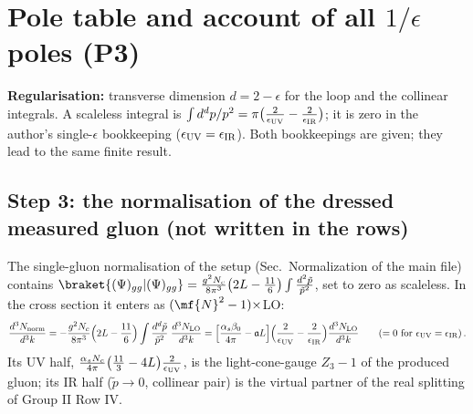 {\color{red}
\section{Pole table and account of all $1/\epsilon$ poles (P3)}\label{sec:dv-table}
 \textbf{Regularisation:} transverse dimension $d=2-\epsilon$ for the loop and the collinear integrals. A scaleless integral is $\int d^{d}p/p^{2}=\pi\big(\frac{2}{\epsilon_{\rm UV}}-\frac{2}{\epsilon_{\rm IR}}\big)$; it is zero in the author's single-$\epsilon$ bookkeeping ($\epsilon_{\rm UV}=\epsilon_{\rm IR}$). Both bookkeepings are given; they lead to the same finite result.

\subsection*{Step 3: the normalisation of the dressed measured gluon (not written in the rows)}
\noindent The single-gluon normalisation of the setup (Sec.~Normalization of the main file) contains $\braket{(\Psi)_{gg}|(\Psi)_{gg}}=\frac{g^{2}N_{c}}{8\pi^{3}}\big(2L-\frac{11}{6}\big)\int\frac{d^{2}\tilde p}{\tilde p^{2}}$, set to zero as scaleless. In the cross section it enters as $(\mf{N}^{2}-1)\times$LO:
\begin{align}
\frac{d^{3}N_{\rm norm}}{d^{3}k}=-\frac{g^{2}N_{c}}{8\pi^{3}}\Big(2L-\frac{11}{6}\Big)\int\frac{d^{d}\tilde p}{\tilde p^{2}}\;\frac{d^{3}N_{\rm LO}}{d^{3}k}=\Big[\frac{\alpha_{s}\beta_{0}}{4\pi}-\mathfrak{a}L\Big]\Big(\frac{2}{\epsilon_{\rm UV}}-\frac{2}{\epsilon_{\rm IR}}\Big)\frac{d^{3}N_{\rm LO}}{d^{3}k}\qquad(=0\ \text{for}\ \epsilon_{\rm UV}=\epsilon_{\rm IR})\,.\label{eq:dv-norm}
\end{align}
\noindent[Calculation: $\frac{g^{2}N_{c}}{8\pi^{3}}\cdot\pi\cdot\frac{11}{6}=\frac{11g^{2}N_{c}}{48\pi^{2}}=\frac{\alpha_{s}\beta_{0}}{4\pi}$ and $\frac{g^{2}N_{c}}{8\pi^{3}}\cdot\pi\cdot2L=\frac{g^{2}N_{c}}{4\pi^{2}}L=\mathfrak{a}L$.] Its UV half, $\frac{\alpha_{s}N_{c}}{4\pi}\big(\frac{11}{3}-4L\big)\frac{2}{\epsilon_{\rm UV}}$, is the light-cone-gauge $Z_{3}-1$ of the produced gluon; its IR half ($\tilde p\to0$, collinear pair) is the virtual partner of the real splitting of Group II Row IV.

}
